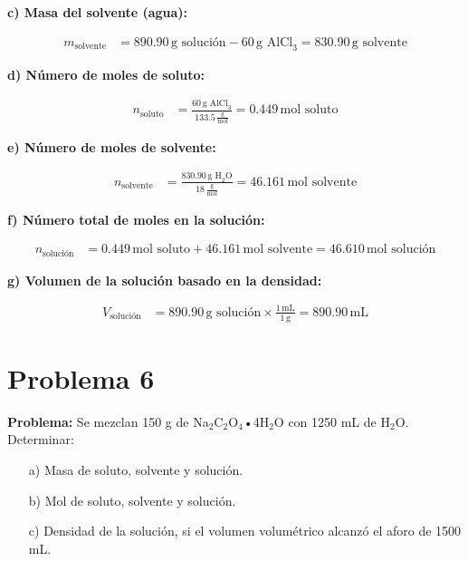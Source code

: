 \documentclass{article}
\begin{document}
\begin{multicols}{2}
\textbf{c) Masa del solvente (agua):}

\begin{align*}
    m_{\text{solvente}} &= 890.90 \, \text{g solución} - 60 \, \text{g AlCl}_3 = 830.90 \, \text{g solvente}
\end{align*}

\textbf{d) Número de moles de soluto:}

\begin{align*}
    n_{\text{soluto}} &= \frac{60 \, \text{g AlCl}_3}{133.5 \, \frac{\text{g}}{\text{mol}}} = 0.449 \, \text{mol soluto}
\end{align*}

\textbf{e) Número de moles de solvente:}

\begin{align*}
    n_{\text{solvente}} &= \frac{830.90 \, \text{g H}_2\text{O}}{18 \, \frac{\text{g}}{\text{mol}}} = 46.161 \, \text{mol solvente}
\end{align*}

\textbf{f) Número total de moles en la solución:}

\begin{align*}
    n_{\text{solución}} &= 0.449 \, \text{mol soluto} + 46.161 \, \text{mol solvente} = 46.610 \, \text{mol solución}
\end{align*}

\textbf{g) Volumen de la solución basado en la densidad:}

\begin{align*}
    V_{\text{solución}} &= 890.90 \, \text{g solución} \times \frac{1 \, \text{mL}}{1 \, \text{g}} = 890.90 \, \text{mL}
\end{align*}

\end{multicols} %










\newpage
\section*{Problema 6}
\textbf{Problema:}
Se mezclan 150 g de Na$_2$C$_2$O$_4$•4H$_2$O con 1250 mL de H$_2$O. Determinar:

\begin{itemize} \item[a)] Masa de soluto, solvente y solución. \item[b)] Mol de soluto, solvente y solución. \item[c)] Densidad de la solución, si el volumen volumétrico alcanzó el aforo de 1500 mL. \end{itemize}
\end{document}
